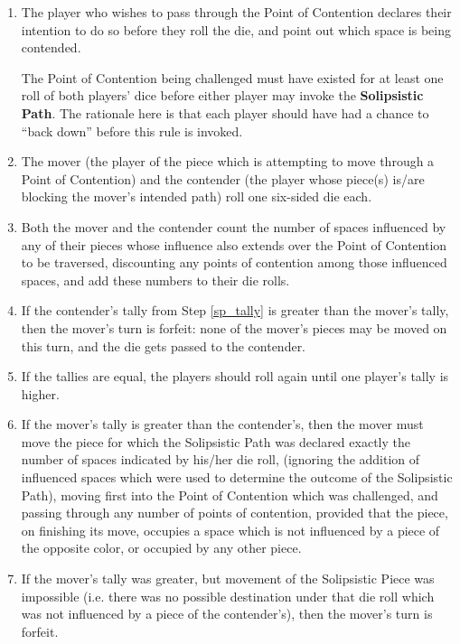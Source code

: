   \begin{enumerate}
  \item
    The player who wishes to pass through the Point of Contention declares
    their intention to do so before they roll the die, and point out which
    space is being contended.

    The Point of Contention being challenged must have existed for at least
    one roll of both players' dice before either player may invoke the
    {\bf Solipsistic Path}.  The rationale here is that each player should
    have had a chance to ``back down'' before this rule is invoked.

  \item
    The mover (the player of the piece which is attempting to move
    through a Point of Contention) and the contender (the player whose
    piece(s) is/are blocking the mover's intended path) roll one
    six-sided die each.

  \item\label{sp_tally}
    Both the mover and the contender count the number of spaces influenced
    by any of their pieces whose influence also extends over the Point of
    Contention to be traversed, discounting any points of contention among
    those influenced spaces, and add these numbers to their die rolls.

  \item
    If the contender's tally from Step \ref{sp_tally} is greater than the
    mover's tally, then the mover's turn is forfeit: none of the mover's
    pieces may be moved on this turn, and the die gets passed to the contender.

  \item
    If the tallies are equal, the players should roll again until one player's
    tally is higher.

  \item\label{sopath_nope}
    If the mover's tally is greater than the contender's, then the mover must move
    the piece for which the Solipsistic Path was declared exactly the number of spaces
    indicated by his/her die roll, (ignoring the addition of influenced spaces which
    were used to determine the outcome of the Solipsistic Path), moving first into the
    Point of Contention which was challenged, and passing through any number of points
    of contention, provided that the piece, on finishing its move, occupies a space which
    is not influenced by a piece of the opposite color, or occupied by any other piece.

  \item\label{sopath_noso}
    If the mover's tally was greater, but movement of the Solipsistic Piece was
    impossible (i.e. there was no possible destination under that die roll which was not
    influenced by a piece of the contender's), then
    the mover's turn is forfeit.
  \end{enumerate}

